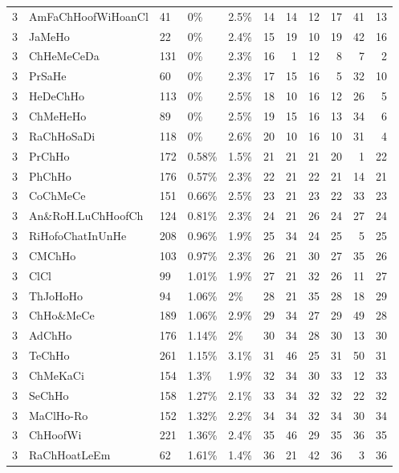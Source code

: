 \begin{longtable}{lllllrrrrrr}
  3 & AmFaChHoofWiHoanCl & 41 & 0\% & 2.5\% &  14 &  14 &  12 &  17 &  41 &  13 \\ 
  3 & JaMeHo & 22 & 0\% & 2.4\% &  15 &  19 &  10 &  19 &  42 &  16 \\ 
  3 & ChHeMeCeDa & 131 & 0\% & 2.3\% &  16 &   1 &  12 &   8 &   7 &   2 \\ 
  3 & PrSaHe & 60 & 0\% & 2.3\% &  17 &  15 &  16 &   5 &  32 &  10 \\ 
  3 & HeDeChHo & 113 & 0\% & 2.5\% &  18 &  10 &  16 &  12 &  26 &   5 \\ 
  3 & ChMeHeHo & 89 & 0\% & 2.5\% &  19 &  15 &  16 &  13 &  34 &   6 \\ 
  3 & RaChHoSaDi & 118 & 0\% & 2.6\% &  20 &  10 &  16 &  10 &  31 &   4 \\ 
  3 & PrChHo & 172 & 0.58\% & 1.5\% &  21 &  21 &  21 &  20 &   1 &  22 \\ 
  3 & PhChHo & 176 & 0.57\% & 2.3\% &  22 &  21 &  22 &  21 &  14 &  21 \\ 
  3 & CoChMeCe & 151 & 0.66\% & 2.5\% &  23 &  21 &  23 &  22 &  33 &  23 \\ 
  3 & An\&RoH.LuChHoofCh & 124 & 0.81\% & 2.3\% &  24 &  21 &  26 &  24 &  27 &  24 \\ 
  3 & RiHofoChatInUnHe & 208 & 0.96\% & 1.9\% &  25 &  34 &  24 &  25 &   5 &  25 \\ 
  3 & CMChHo & 103 & 0.97\% & 2.3\% &  26 &  21 &  30 &  27 &  35 &  26 \\ 
  3 & ClCl & 99 & 1.01\% & 1.9\% &  27 &  21 &  32 &  26 &  11 &  27 \\ 
  3 & ThJoHoHo & 94 & 1.06\% & 2\% &  28 &  21 &  35 &  28 &  18 &  29 \\ 
  3 & ChHo\&MeCe & 189 & 1.06\% & 2.9\% &  29 &  34 &  27 &  29 &  49 &  28 \\ 
  3 & AdChHo & 176 & 1.14\% & 2\% &  30 &  34 &  28 &  30 &  13 &  30 \\ 
  3 & TeChHo & 261 & 1.15\% & 3.1\% &  31 &  46 &  25 &  31 &  50 &  31 \\ 
  3 & ChMeKaCi & 154 & 1.3\% & 1.9\% &  32 &  34 &  30 &  33 &  12 &  33 \\ 
  3 & SeChHo & 158 & 1.27\% & 2.1\% &  33 &  34 &  32 &  32 &  22 &  32 \\ 
  3 & MaClHo-Ro & 152 & 1.32\% & 2.2\% &  34 &  34 &  32 &  34 &  30 &  34 \\ 
  3 & ChHoofWi & 221 & 1.36\% & 2.4\% &  35 &  46 &  29 &  35 &  36 &  35 \\ 
  3 & RaChHoatLeEm & 62 & 1.61\% & 1.4\% &  36 &  21 &  42 &  36 &   3 &  36 \\ 

\end{longtable}
